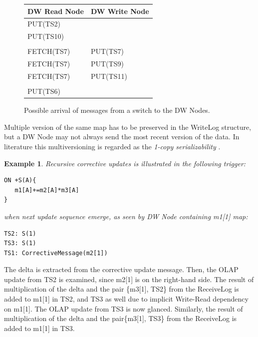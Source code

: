 \documentclass{sig-semester}
\newtheorem{example}[theorem]{Example}
\def\OLAP{OLAP\xspace}
\begin{document}
\begin{figure}
\begin{center}

\begin{tabular}{l|l}
DW Read Node      &     DW Write Node\\
\hline
PUT(TS2)   & \\
PUT(TS10)  & \\
           & \\
FETCH(TS7) & PUT(TS7)  \\
FETCH(TS7) & PUT(TS9)  \\
FETCH(TS7) & PUT(TS11)  \\
           & \\
PUT(TS6)   & \\   
\end{tabular}
\end{center}

\vspace{-3mm}
\caption{Possible arrival of messages from a switch to the DW Nodes.}
\label{fig:correct}
\vspace{-2mm}
\end{figure}

Multiple version of the same map has to be preserved in the WriteLog structure, but a DW Node may not always send the most recent version of the data. In literature this multiversioning is regarded as the \textit{1-copy serializability} \cite{Rachid08}.

\begin{example} \em
\label{ex:recursive}
Recursive corrective updates is illustrated in the following trigger:
\begin{verbatim}
ON +S(A){
   m1[A]+=m2[A]*m3[A]
}
\end{verbatim}
when next update sequence emerge, as seen by DW Node containing m1[1] map:
\begin{verbatim}
TS2: S(1)
TS3: S(1)
TS1: CorrectiveMessage(m2[1])
\end{verbatim}
\end{example}
The delta is extracted from the corrective update message. Then, the \OLAP update from TS2 is examined, since m2[1] is on the right-hand side. The result of multiplication of the delta and the pair \{m3[1], TS2\} from the ReceiveLog is added to m1[1] in TS2, and TS3 as well due to implicit Write-Read dependency on m1[1]. The \OLAP update from TS3 is now glanced. Similarly, the result of multiplication of the delta and the pair\{m3[1], TS3\} from the ReceiveLog is added to m1[1] in TS3.
\end{document}

